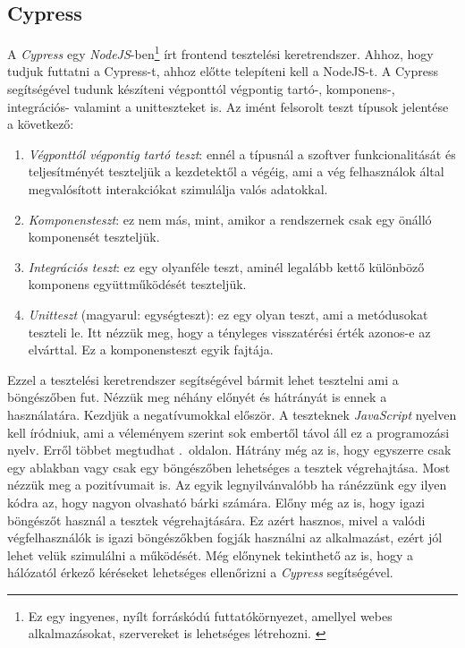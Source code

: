 \documentclass[]{thesis-ekf}
\theoremstyle{definition}
\theoremstyle{remark}
\begin{document}
	\subsection{Cypress}
		A \emph{Cypress} egy \emph{NodeJS}-ben\footnote{Ez egy ingyenes, nyílt forráskódú futtatókörnyezet, amellyel webes alkalmazásokat, szervereket is lehetséges létrehozni. \cite{NodeJS}} írt frontend tesztelési keretrendszer. Ahhoz, hogy tudjuk futtatni a Cypress-t, ahhoz előtte telepíteni kell a NodeJS-t. A Cypress segítségével tudunk készíteni végponttól végpontig tartó-, komponens-, integrációs- valamint a unitteszteket is.
		Az imént felsorolt teszt típusok jelentése a következő:
		\begin{enumerate}
			\item \emph{Végponttól végpontig tartó teszt}: ennél a típusnál a szoftver funkcionalitását és teljesítményét teszteljük a kezdetektől a végéig, ami a vég felhasználok által megvalósított interakciókat szimulálja valós adatokkal.
			\item \emph{Komponensteszt}: ez nem más, mint, amikor a rendszernek csak egy önálló komponensét teszteljük.
			\item \emph{Integrációs teszt}: ez egy olyanféle teszt, aminél legalább kettő különböző komponens együttműködését teszteljük.
			\item \emph{Unitteszt} (magyarul: egységteszt): ez egy olyan teszt, ami a metódusokat teszteli le. Itt nézzük meg, hogy a tényleges visszatérési érték azonos-e az elvárttal. Ez a komponensteszt egyik fajtája.
		\end{enumerate}
		Ezzel a tesztelési keretrendszer segítségével bármit lehet tesztelni ami a böngészőben fut. Nézzük meg néhány előnyét és hátrányát is ennek a használatára. Kezdjük a negatívumokkal először. A teszteknek \emph{JavaScript} nyelven kell íródniuk, ami a véleményem szerint sok embertől távol áll ez a programozási nyelv. Erről többet megtudhat \az{\pageref{javascript}}.~oldalon. Hátrány még az is, hogy egyszerre csak egy ablakban vagy csak egy böngészőben lehetséges a tesztek végrehajtása. Most nézzük meg a pozitívumait is. Az egyik legnyilvánvalóbb ha ránézzünk egy ilyen kódra az, hogy nagyon olvasható bárki számára. Előny még az is, hogy igazi böngészőt használ a tesztek végrehajtására. Ez azért hasznos, mivel a valódi végfelhasználók is igazi böngészőkben fogják használni az alkalmazást, ezért jól lehet velük szimulálni a működését. Még előnynek tekinthető az is, hogy a hálózatól érkező kéréseket lehetséges ellenőrizni a \emph{Cypress} segítségével.
		\cite{Kusper Szoftvertesztles, Cypress, Katalon, Medium}
		
\end{document}
